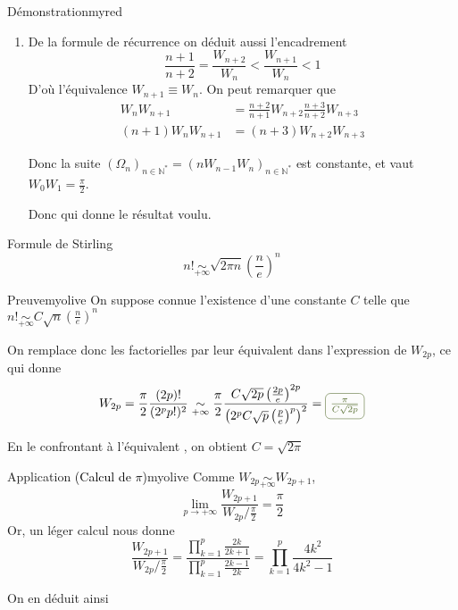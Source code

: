 \begin{omed}{Démonstration}{myred}
\begin{enumerate}
    \item De la formule de récurrence on déduit aussi l’encadrement 
    \[ \frac{n+1}{n+2} = \frac{W_{n+2}}{W_n} < \frac{W_{n+1}}{W_n} < 1 \] 
    D’où l’équivalence $W_{n+1} \equiv W_n$. On peut remarquer que
    \begin{align*}
        W_n W_{n+1} &= \frac{n+2}{n+1} W_{n+2} \frac{n+3}{n+2} W_{n+3} \\
        (n+1) W_n W_{n+1} &= (n+3) W_{n+2} W_{n+3} 
    \end{align*}

    Donc la suite $(\Omega_n)_{n \in \mathbb{N}^*} = (n W_{n-1} W_n)_{n \in \mathbb{N}^*}$ est constante, et vaut $W_0 W_1 = \frac{\pi}{2}$. 
    
    Donc  qui donne le résultat voulu.
    \end{enumerate}
    \null\hfill{\textcolor{myred}{}}
    \end{omed}

    \begin{prop}{Formule de Stirling}{}
        \[ n! \underset{+\infty}{\sim} \sqrt{2 \pi n} \left(\frac{n}{e}\right)^n \]
    \end{prop}

    \begin{demo}{Preuve}{myolive}
       On suppose connue l’existence d’une constante $C$ telle que $n! \underset{+\infty}{\sim} C \sqrt{n} \left(\frac{n}{e}\right)^n $ 
       
       On remplace donc les factorielles par leur équivalent dans l’expression de $W_{2p}$, ce qui donne 
       \[ W_{2p} = \frac{\pi}{2} \frac{(2p)!}{(2^p p!)^2} \underset{+\infty}{\sim} \frac{\pi}{2} \frac{C \sqrt{2p} \left(\frac{2p}{e}\right)^{2p}}{\left(2^p C \sqrt{p} \left(\frac{p}{e}\right)^p\right)^2} = \lilbox{myolive}{$\frac{\pi}{C \sqrt{2p} }$} \] 
   
       En le confrontant à l’équivalent , on obtient $C = \sqrt{2\pi}$  
    \end{demo}

    \begin{omed}{Application \textcolor{black}{(Calcul de $\pi$)}}{myolive}
        Comme $W_{2p} \underset{+\infty}{\sim} W_{2p+1}$, 
    \[ \lim\limits_{p \rightarrow + \infty} \frac{W_{2p+1}}{W_{2p} / \frac{\pi}{2}} = \frac{\pi}{2} \]
    Or, un léger calcul nous donne 
    \[ \frac{W_{2p+1}}{W_{2p} / \frac{\pi}{2}} = \frac{\prod\limits_{k=1}^p \frac{2k}{2k+1}}{\prod\limits_{k=1}^p \frac{2k-1}{2k}} = \prod\limits_{k=1}^p \frac{4k^2}{4k^2 - 1} \]

    On en déduit ainsi 
    \end{omed}

